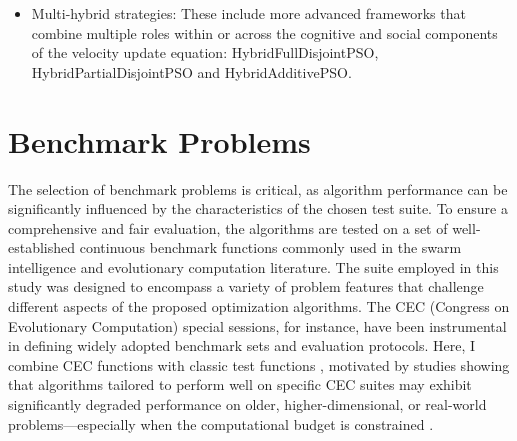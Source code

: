 {\begin{itemize}
    \item Multi-hybrid strategies:    
      These include more advanced frameworks that combine multiple roles within or across the cognitive and social components of the velocity update equation: HybridFullDisjointPSO, HybridPartialDisjointPSO and HybridAdditivePSO.
\end{itemize}












\section{Benchmark Problems}

The selection of benchmark problems is critical, as algorithm performance can be significantly influenced by the characteristics of the chosen test suite. To ensure a comprehensive and fair evaluation, the algorithms are tested on a set of well-established continuous benchmark functions commonly used in the swarm intelligence and evolutionary computation literature. The suite employed in this study was designed to encompass a variety of problem features that challenge different aspects of the proposed optimization algorithms. The CEC (Congress on Evolutionary Computation) special sessions, for instance, have been instrumental in defining widely adopted benchmark sets and evaluation protocols. Here, I combine CEC functions \citep{liang2013cec2013,wu2017cec2017} with classic test functions \citep{jamil2013survey}, motivated by studies showing that algorithms tailored to perform well on specific CEC suites may exhibit significantly degraded performance on older, higher-dimensional, or real-world problems—especially when the computational budget is constrained \citep{piotrowski2023benchmark}.



}
